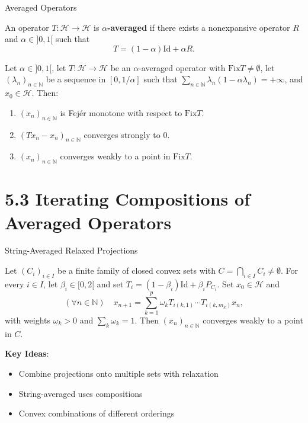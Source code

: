 \documentclass[aspectratio=169,10pt]{beamer}
\begin{document}
\begin{frame}{Averaged Operators}
    \begin{definition}
        An operator $T: \mathcal{H} \to \mathcal{H}$ is \textbf{$\alpha$-averaged} if there exists a nonexpansive operator $R$ and $\alpha \in ]0, 1[$ such that
        \[
            T = (1 - \alpha) \text{Id} + \alpha R.
        \]
    \end{definition}

    \vspace{0.3cm}

    \begin{theorem}[Proposition 5.16]
        Let $\alpha \in ]0, 1[$, let $T: \mathcal{H} \to \mathcal{H}$ be an $\alpha$-averaged operator with $\text{Fix} T \neq \emptyset$, let $(\lambda_n)_{n \in \mathbb{N}}$ be a sequence in $[0, 1/\alpha]$ such that $\sum_{n \in \mathbb{N}} \lambda_n(1 - \alpha\lambda_n) = +\infty$, and $x_0 \in \mathcal{H}$.
        Then:
        \begin{enumerate}
            \item $(x_n)_{n \in \mathbb{N}}$ is Fejér monotone with respect to $\text{Fix} T$.
            \item $(Tx_n - x_n)_{n \in \mathbb{N}}$ converges strongly to $0$.
            \item $(x_n)_{n \in \mathbb{N}}$ converges weakly to a point in $\text{Fix} T$.
        \end{enumerate}
    \end{theorem}
\end{frame}

\section{5.3 Iterating Compositions of Averaged Operators}

\begin{frame}{String-Averaged Relaxed Projections}
    \begin{example}[Example 5.21]
        Let $(C_i)_{i \in I}$ be a finite family of closed convex sets with $C = \bigcap_{i \in I} C_i \neq \emptyset$.
        For every $i \in I$, let $\beta_i \in [0, 2[$ and set $T_i = (1 - \beta_i)\text{Id} + \beta_i P_{C_i}$.
        Set $x_0 \in \mathcal{H}$ and
        \[
            (\forall n \in \mathbb{N}) \quad x_{n+1} = \sum_{k=1}^p \omega_k T_{i(k,1)} \cdots T_{i(k,m_k)} x_n,
        \]
        with weights $\omega_k > 0$ and $\sum_k \omega_k = 1$.
        Then $(x_n)_{n \in \mathbb{N}}$ converges weakly to a point in $C$.
    \end{example}

    \vspace{0.3cm}

    \textbf{Key Ideas}:
    \begin{itemize}
        \item Combine projections onto multiple sets with relaxation
        \item String-averaged uses compositions
        \item Convex combinations of different orderings
    \end{itemize}
\end{frame}
\end{document}
